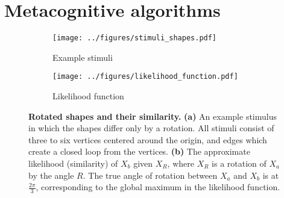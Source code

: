 \documentclass{article} %
\begin{document}
\section{Metacognitive algorithms}

\begin{figure}[t]
  \centering
  \begin{subfigure}[b]{0.4\textwidth}
    \centering
    \texttt{[image: ../figures/stimuli\_shapes.pdf]}
    \vspace{0pt}
    \caption{Example stimuli}
    \label{fig:stimuli}
  \end{subfigure}
  \begin{subfigure}[b]{0.4\textwidth}
    \centering
    \texttt{[image: ../figures/likelihood\_function.pdf]}
    \caption{Likelihood function}
    \label{fig:likelihood}
  \end{subfigure}
  \caption{\textbf{Rotated shapes and their similarity.}  \textbf{(a)}
    An example stimulus in which the shapes differ only by a
    rotation. All stimuli consist of three to six vertices centered
    around the origin, and edges which create a closed loop from the
    vertices. \textbf{(b)} The approximate likelihood (similarity) of
    $X_b$ given $X_R$, where $X_R$ is a rotation of $X_a$ by the angle
    $R$. The true angle of rotation between $X_a$ and $X_b$ is at
    $\frac{2\pi}{3}$, corresponding to the global maximum in the
    likelihood function.}
  \label{fig:shapes}
\end{figure}
\end{document}
